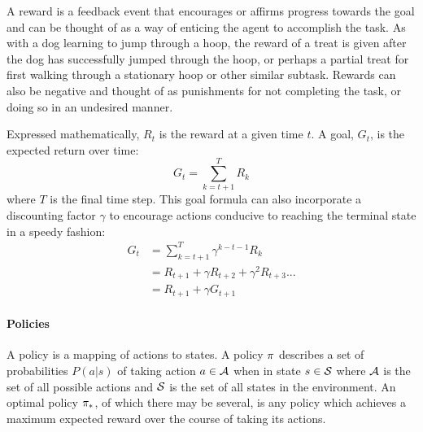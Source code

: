 A reward is a feedback event that encourages or affirms progress
towards the goal
and 
can be thought of as a way of enticing the agent to accomplish the task.
%
As with a dog learning to jump through a hoop,
the reward of a treat is given after the dog has successfully jumped
through the hoop,
or perhaps a partial treat for first walking through a stationary hoop
or other similar subtask.
%
Rewards can also be negative
and thought of as punishments for not completing the task,
or doing so in an undesired manner.

Expressed mathematically, $R_t$ is the reward at a given time $t$.
%
A goal, $G_t$, is the expected return over time:
\[
	G_t = \sum_{k=t+1}^{T} R_k
\]
where $T$ is the final time step.
%
This goal formula can also incorporate a discounting factor $\gamma$ to
encourage actions conducive to reaching the terminal state in a speedy fashion:
\begin{align*}
	G_t &= \sum_{k=t+1}^{T} \gamma^{k-t-1} R_k \\
		&= R_{t+1} + \gamma R_{t+2} + \gamma^2 R_{t+3} ... \\
		&= R_{t+1} + \gamma G_{t+1}
\end{align*}

\paragraph*{Policies}

A policy is a mapping of actions to states.
%
A policy $\pi$ describes a set of probabilities $P(a|s)$
of taking action $a \in \mathcal{A}$
when in state $s \in \mathcal{S}$
where $\mathcal{A}$ is the set of all possible actions
and $\mathcal{S}$ is the set of all states in the environment.
%
An optimal policy $\pi_*$,
of which there may be several,
is any policy which achieves a maximum expected reward over the course of
taking its actions.

